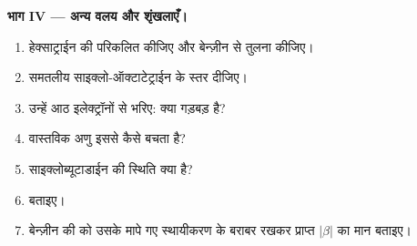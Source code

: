 \begin{problem}
\medskip
\noindent\textbf{भाग IV --- अन्य वलय और शृंखलाएँ।}
\begin{enumerate}[resume]
  \item हेक्साट्राईन की  परिकलित कीजिए और बेन्ज़ीन से तुलना कीजिए।
  \item समतलीय साइक्लो-ऑक्टाटेट्राईन के स्तर दीजिए।
  \item उन्हें आठ इलेक्ट्रॉनों से भरिए: क्या गड़बड़ है?
  \item वास्तविक अणु इससे कैसे बचता है?
  \item साइक्लोब्यूटाडाईन की स्थिति क्या है?
  \item {} बताइए।
  \item बेन्ज़ीन की  को उसके मापे गए स्थायीकरण के बराबर रखकर
        प्राप्त $|\beta|$ का मान बताइए।
\end{enumerate}
\end{problem}
